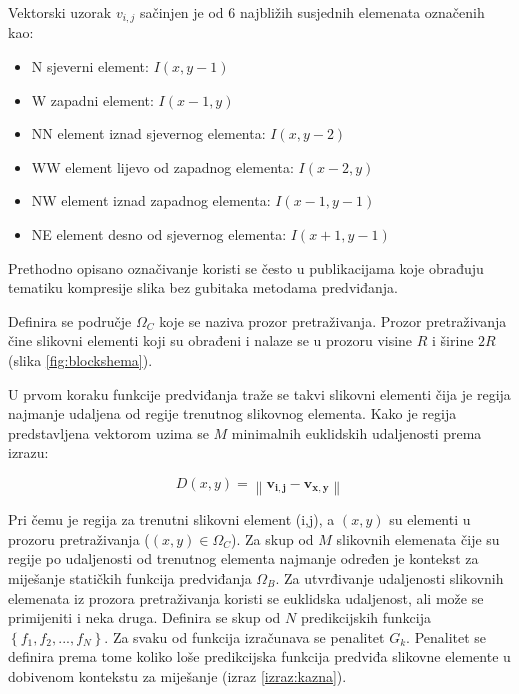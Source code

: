 \documentclass[times, utf8, zavrsni, numeric, sort]{fer}
\begin{document}
Vektorski uzorak $v_{i,j}$ sačinjen je od 6 najbližih susjednih elemenata označenih kao:
\begin{itemize}
\item N sjeverni element: $I(x, y-1)$
\item W zapadni element: $I(x-1,y)$
\item NN element iznad sjevernog elementa: $I(x, y-2)$
\item WW element lijevo od zapadnog elementa: $I(x-2,y)$
\item NW element iznad zapadnog elementa: $I(x-1,y-1)$
\item NE element desno od sjevernog elementa: $I(x+1, y-1)$
\end{itemize}

Prethodno opisano označivanje koristi se često u publikacijama koje obrađuju tematiku kompresije slika bez gubitaka metodama predviđanja.

Definira se područje $\Omega_{C}$ koje se naziva prozor pretraživanja. Prozor pretraživanja čine slikovni elementi koji su obrađeni i nalaze se u prozoru visine $R$ i širine $2R$ (slika \ref{fig:blockshema}).

\begin{comment}
\begin{figure}[htb]
\centering
\texttt{[image: slike/blendpredictorcontext\_rektor.eps]}
\caption{Prozor pretraživanja za slikovni element na poziciji $(x,y)$}
\label{fig:celije}
\end{figure}
\end{comment}

U prvom koraku funkcije predviđanja traže se takvi slikovni elementi čija je regija najmanje udaljena od regije trenutnog slikovnog elementa. Kako je regija predstavljena vektorom uzima se $M$ minimalnih  euklidskih udaljenosti prema izrazu:

\begin{equation}
D(x,y) = \left \|  \mathbf{v_{i,j}-\mathbf{v_{x,y}}}\right \|
\end{equation}

Pri čemu je regija za trenutni slikovni element (i,j), a $(x, y)$ su elementi u prozoru pretraživanja ($(x,y)\in \Omega_{C}$).
Za skup od $M$ slikovnih elemenata čije su regije po udaljenosti od trenutnog elementa najmanje određen je kontekst za miješanje statičkih funkcija predviđanja $\Omega_{B}$. Za utvrđivanje udaljenosti slikovnih elemenata iz prozora pretraživanja koristi se euklidska udaljenost, ali može se primijeniti i neka druga.
Definira se skup od $N$ predikcijskih funkcija $\left \{ f_{1}, f_{2}, ... , f_{N}\right \} $. Za svaku od funkcija izračunava se penalitet $G_{k}$. Penalitet se definira prema tome koliko loše predikcijska funkcija predviđa slikovne elemente u dobivenom kontekstu za miješanje (izraz \ref{izraz:kazna}).
\end{document}
